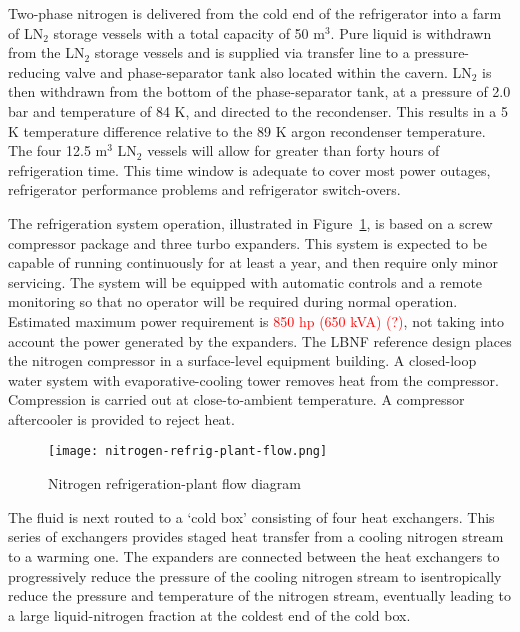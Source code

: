 Two-phase nitrogen is delivered from the cold end of the refrigerator 
into a farm of  LN$_2$ storage vessels with a total capacity of 50 m$^3$. 
Pure liquid is withdrawn from the LN$_2$ storage vessels and is supplied 
via transfer line to a pressure-reducing valve and phase-separator tank 
also located within the cavern. LN$_2$ is then withdrawn from the bottom 
of the phase-separator tank, at a pressure of 2.0 bar and temperature of 
84 K, and directed to the recondenser. This results in a 5 K temperature 
difference relative to the 89 K argon recondenser temperature. The 
four 12.5 m$^3$ LN$_2$ vessels will allow for greater than forty hours 
of refrigeration time. This time window is adequate to cover most power 
outages, refrigerator performance problems and refrigerator switch-overs.


The refrigeration system operation, illustrated in Figure~\ref{fig:LN2-refrigerator-flow}, 
is based on a screw compressor package and three turbo expanders. 
This system is expected to be capable of running  
continuously for at least a year, and then require only 
minor servicing. The system will be equipped with 
automatic controls and a remote monitoring so that no operator 
will be required during normal operation. 
Estimated maximum power requirement is \textcolor{red}{850 hp (650 kVA) (?)}, 
not taking into account the power generated by the expanders.  
The LBNF reference design places the nitrogen compressor in 
a surface-level equipment building. A closed-loop water system 
with evaporative-cooling tower removes heat from the compressor. 
Compression is carried out at close-to-ambient temperature. 
A compressor aftercooler is provided to reject heat. 

\begin{figure}[htbp]
\centering
\texttt{[image: nitrogen-refrig-plant-flow.png]}
\caption{Nitrogen refrigeration-plant flow diagram}
\label{fig:LN2-refrigerator-flow}
\end{figure}

The fluid is next routed to a `cold box' consisting of four heat exchangers.  
This series of exchangers provides staged heat transfer from a cooling 
nitrogen stream to a warming one.  The expanders are connected between 
the heat exchangers to progressively reduce the pressure of the cooling 
nitrogen stream to isentropically reduce the pressure and temperature of the
nitrogen stream, eventually leading to a large liquid-nitrogen fraction 
at the coldest end of the cold box. 

